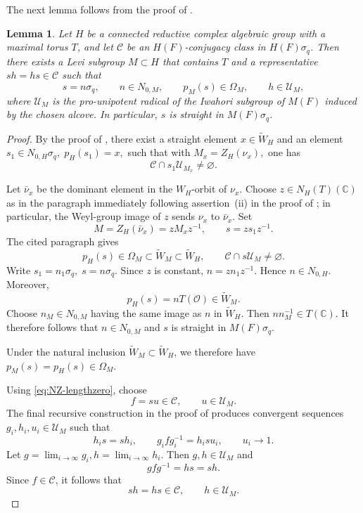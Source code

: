 \documentclass[11pt]{amsart}
\numberwithin{equation}{section}
\newtheorem{lemma}[lemma]{Lemma}
\theoremstyle{definition}
\theoremstyle{remark}
\begin{document}
The next lemma follows from the proof of \cite[Proposition~3.1]{NZ}.
\begin{lemma}\label{lem:NZ-newton-levi}
Let $H$ be a connected reductive complex algebraic group with a maximal torus $T$, and
let $\mathcal C$ be an $H(F)$-conjugacy class in
$H(F)\sigma_q$. Then there exists a Levi subgroup $M\subset H$ that contains $T$ and a representative $sh=hs\in\mathcal C$ such that
\begin{equation}\label{eq:NZ-data}
  s=n\sigma_q,\qquad n\in N_{0,M},\qquad
  p_M(s)\in\Omega_M,\qquad h\in \mathcal{U}_M,
\end{equation}
where $\mathcal{U}_M$ is the pro-unipotent radical of the Iwahori subgroup of $M(F)$ induced by the chosen alcove. In particular, $s$ is straight in $M(F)\sigma_q$.
\end{lemma}
\begin{proof}
By the proof of \cite[Proposition~3.1]{NZ}, there exist a straight
element $x\in\widetilde W_H$ and an element $s_1\in N_{0,H}\sigma_q,\;
p_H(s_1)=x,$
such that with $  M_x=Z_H(\nu_x),$ one has
\begin{equation}\label{eq:NZ-Levi-intersection}
  \mathcal C\cap s_1\mathcal U_{M_x}\neq\varnothing.
\end{equation}

Let $\bar\nu_x$ be the dominant element in the $W_H$-orbit of
$\nu_x$. Choose $z\in N_H(T)(\mathbb C)$ as in the paragraph
immediately following assertion~(ii) in the proof of
\cite[Proposition~3.1]{NZ}; in particular, the Weyl-group image
of $z$ sends $\nu_x$ to $\bar\nu_x$. Set
\[
  M=Z_H(\bar\nu_x)=zM_xz^{-1},
  \qquad
  s=zs_1z^{-1}.
\]
The cited paragraph gives
\begin{equation}\label{eq:NZ-lengthzero}
p_H(s)\in\Omega_M\subset\widetilde W_M\subset\widetilde W_H,
  \qquad
  \mathcal C\cap s\mathcal{U}_M\neq\varnothing.
\end{equation}
Write $ s_1=n_1\sigma_q, \;  s=n\sigma_q.$ Since $z$ is constant,  $n=zn_1z^{-1}.$
Hence $n\in N_{0,H}$. Moreover,
\[
  p_H(s)=nT(\mathcal O)\in\widetilde W_M.
\]
Choose $n_M\in N_{0,M}$ having the same image as $n$ in
$\widetilde W_H$. Then $nn_M^{-1}\in T(\mathbb C)$. It therefore follows that $ n\in N_{0,M}$ and $s$ is straight in $M(F)\sigma_q$.

Under the natural inclusion
$\widetilde W_M\subset\widetilde W_H$, we therefore have $p_M(s)=p_H(s)\in\Omega_M.$

Using \eqref{eq:NZ-lengthzero}, choose
\[
  f=su\in\mathcal C,
  \qquad
  u\in\mathcal U_M.
\]
The final recursive construction in the proof of \cite[Proposition~3.1]{NZ} produces convergent sequences
$g_i,h_i,u_i\in\mathcal U_M$
such that
\[
  h_is=sh_i,
  \qquad
  g_ifg_i^{-1}=h_isu_i,
  \qquad
  u_i\longrightarrow1.
\]
Let $g=\lim_{i\to\infty}g_i,  h=\lim_{i\to\infty}h_i.$
Then $g,h\in\mathcal U_M$ and
\[
  gfg^{-1}=hs=sh.
\]
Since $f\in\mathcal C$, it follows that
\[
  sh=hs\in\mathcal C,
  \qquad
  h\in\mathcal U_M.
\]
\end{proof}
\end{document}
